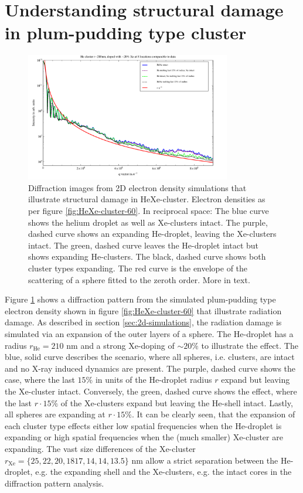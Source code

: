 \section{Understanding structural damage in plum-pudding type cluster}\label{sec:helium-xenon-data}
\begin{figure}
	\centering
		\includegraphics[width=0.80\textwidth]{images/results/simulations-damage-explain.pdf}
	\caption[Simulated structural damage scenarios in HeXe-cluster]{Diffraction images from 2D electron density simulations that illustrate structural damage in HeXe-cluster. Electron densities as per figure \ref{fig:HeXe-cluster-60}. In reciprocal space: The blue curve shows the helium droplet as well as Xe-clusters intact. The purple, dashed curve shows an expanding He-droplet, leaving the Xe-clusters intact. The green, dashed curve leaves the He-droplet intact but shows expanding He-clusters. The black, dashed curve shows both cluster types expanding. The red curve is the envelope of the scattering of a sphere fitted to the zeroth order. More in text.}
	\label{fig:simulations-damage-explain}
\end{figure}
Figure \ref{fig:simulations-damage-explain} shows a diffraction pattern from the simulated plum-pudding type electron density shown in figure \ref{fig:HeXe-cluster-60} that illustrate radiation damage. As described in section \ref{sec:2d-simulations}, the radiation damage is simulated via an expansion of the outer layers of a sphere. The He-droplet has a radius $r_{\text{He}}=210$ nm and a strong Xe-doping of $\sim 20 \%$ to illustrate the effect. The blue, solid curve describes the scenario, where all spheres, i.e. clusters, are intact and no X-ray induced dynamics are present. The purple, dashed curve shows the case, where the last $15 \%$ in units of the He-droplet radius $r$ expand but leaving the Xe-cluster intact. Conversely, the green, dashed curve shows the effect, where the last $r\cdot 15 \%$ of the Xe-clusters expand but leaving the He-shell intact. Lastly, all spheres are expanding at $r\cdot 15 \%$. It can be clearly seen, that the expansion of each cluster type effects either low spatial frequencies when the He-droplet is expanding or high spatial frequencies when the (much smaller) Xe-cluster are expanding. The vast size differences of the Xe-cluster $r_{\text{Xe}}=\{25, 22, 20, 18 17, 14, 14, 13.5\}$ nm allow a strict separation between the He-droplet, e.g. the expanding shell and the Xe-clusters, e.g. the intact cores in the diffraction pattern analysis.\\
